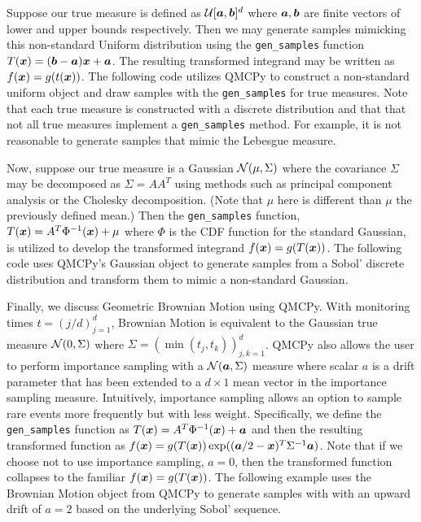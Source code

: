 \documentclass[graybox,footinfo]{svmult}
\begin{document}
Suppose our true measure is defined as ${\mathcal{U}}[{\boldsymbol{a}},{\boldsymbol{b}}]^d$ where ${\boldsymbol{a}},{\boldsymbol{b}}$ are finite vectors of lower and upper bounds respectively. Then we may generate samples mimicking this non-standard Uniform distribution using the \texttt{gen\_samples} function $T({\boldsymbol{x}}) = ({\boldsymbol{b}}-{\boldsymbol{a}}){\boldsymbol{x}} + {\boldsymbol{a}}$. The resulting transformed integrand may be written as $f({\boldsymbol{x}}) = g(t({\boldsymbol{x}}))$. The following code utilizes QMCPy to construct a non-standard uniform object and draw samples with the \texttt{gen\_samples} for true measures.  Note that each true measure is constructed with a discrete distribution and that that not all true measures implement a \texttt{gen\_samples} method. For example, it is not reasonable to generate samples that mimic the Lebesgue measure. 




Now, suppose our true measure is a Gaussian ${\mathcal{N}}(\mu,\Sigma)$ where the covariance $\Sigma$ may be decomposed as $\Sigma=AA^T$ using methods such as principal component analysis or the Cholesky decomposition. (Note that $\mu$ here is different than $\mu$ the previously defined mean.) Then the \texttt{gen\_samples} function, $T({\boldsymbol{x}}) = A^T \Phi^{-1}({\boldsymbol{x}}) + \mu$ where $\Phi$ is the CDF function for the standard Gaussian, is utilized to develop the transformed integrand $f({\boldsymbol{x}}) = g(T({\boldsymbol{x}}))$. The following code uses QMCPy's Gaussian object to generate samples from a Sobol' discrete distribution and transform them to mimic a non-standard Gaussian.   



Finally, we discuss Geometric Brownian Motion using QMCPy. With monitoring times $t = (j/d)_{j=1}^d$, Brownian Motion is equivalent to the Gaussian true measure ${\mathcal{N}}(0,\Sigma)$ where $\Sigma = (\min(t_j,t_k))_{j,k=1}^d$. QMCPy also allows the user to perform importance sampling with a ${\mathcal{N}}({\boldsymbol{a}},\Sigma)$ measure where scalar $a$ is a drift parameter that has been extended to a $d \times 1$ mean vector in the importance sampling measure. Intuitively, importance sampling allows an option to sample rare events more frequently but with less weight. Specifically, we define the \texttt{gen\_samples} function as $T({\boldsymbol{x}}) = A^T\Phi^{-1}({\boldsymbol{x}}) + {\boldsymbol{a}}$ and then the resulting transformed function as $f({\boldsymbol{x}}) = g(T({\boldsymbol{x}}))\exp(({\boldsymbol{a}}/2-{\boldsymbol{x}})^T\Sigma^{-1}{\boldsymbol{a}})$. Note that if we choose not to use importance sampling, $a=0$, then the transformed function collapses to the familiar $f({\boldsymbol{x}}) = g(T({\boldsymbol{x}}))$. The following example uses the Brownian Motion object from QMCPy to generate samples with with an upward drift of $a=2$ based on the underlying Sobol' sequence. 
\end{document}
